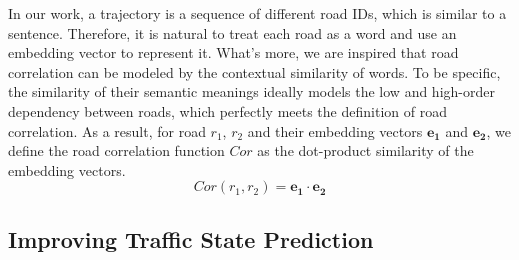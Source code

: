In our work, a trajectory is a sequence of different road IDs, which is similar to a sentence. Therefore, it is natural to treat each road as a word and use an embedding vector to represent it. What's more, we are inspired that road correlation can be modeled by the contextual similarity of words. To be specific, the similarity of their semantic meanings ideally models the low and high-order dependency between roads, which perfectly meets the definition of road correlation. As a result, for road $r_1$, $r_2$ and their embedding vectors $\mathbf{e_1}$ and $\mathbf{e_2}$, we define the road correlation function $Cor$ as the dot-product similarity\cite{dot_prod_simi} of the embedding vectors.
\begin{equation}
    Cor(r_1, r_2)=\mathbf{e_1}\cdot \mathbf{e_2}
\end{equation}

\subsection{Improving Traffic State Prediction}
